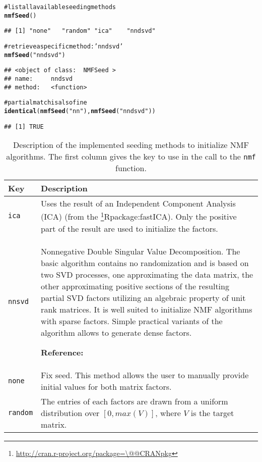 \documentclass[a4paper]{article}\usepackage{graphicx, color}
\makeatletter
\newcommand{\hlfunctioncall}[1]{\textcolor[rgb]{0.501960784313725,0,0.329411764705882}{\textbf{#1}}}%
\newcommand{\hlstring}[1]{\textcolor[rgb]{0.6,0.6,1}{#1}}%
\newcommand{\hlcomment}[1]{\textcolor[rgb]{0.180392156862745,0.6,0.341176470588235}{#1}}%
\newenvironment{kframe}{%
 \def\at@end@of@kframe{}%
 \ifinner\ifhmode%
  \def\at@end@of@kframe{\end{minipage}}%
  \begin{minipage}{\columnwidth}%
 \fi\fi%
 \def\FrameCommand##1{\hskip\@totalleftmargin \hskip-\fboxsep
 \colorbox{shadecolor}{##1}\hskip-\fboxsep
     \hskip-\linewidth \hskip-\@totalleftmargin \hskip\columnwidth}%
 \MakeFramed {\advance\hsize-\width
   \@totalleftmargin\z@ \linewidth\hsize
   \@setminipage}}%
 {\par\unskip\endMakeFramed%
 \at@end@of@kframe}
\newenvironment{knitrout}{}{} %
\let\code=\texttt
\newcommand{\pkgname}[1]{\textit{#1}\xspace}
\newcommand{\CRANurl}[1]{\url{http://cran.r-project.org/package=#1}}
\def\CRANpkg{\@ifstar\@CRANpkg\@@CRANpkg}
\def\@CRANpkg#1{\href{http://cran.r-project.org/package=#1}{\pkgname{#1}}\footnote{\CRANurl{#1}}}
\def\@@CRANpkg#1{\href{http://cran.r-project.org/package=#1}{\pkgname{#1}} package\footnote{\CRANurl{#1}}}
\def\citeCRANpkg{\@ifstar\@citeCRANpkg\@@citeCRANpkg}
\def\@citeCRANpkg#1{\CRANpkg{#1}\cite*{Rpackage:#1}}
\def\@@citeCRANpkg#1{\CRANpkg{#1}~\cite{Rpackage:#1}}
\renewcommand{\cite}[1]{\parencite{#1}}
\makeatother
\begin{document}
\begin{knitrout}
\color{fgcolor}\begin{kframe}
\begin{alltt}
\hlcomment{# list all available seeding methods}
\hlfunctioncall{nmfSeed}()
\end{alltt}
\begin{verbatim}
## [1] "none"   "random" "ica"    "nndsvd"
\end{verbatim}
\begin{alltt}
\hlcomment{# retrieve a specific method: 'nndsvd'}
\hlfunctioncall{nmfSeed}(\hlstring{"nndsvd"})
\end{alltt}
\begin{verbatim}
## <object of class:  NMFSeed >
## name:	 nndsvd 
## method:	 <function>
\end{verbatim}
\begin{alltt}
\hlcomment{# partial match is also fine}
\hlfunctioncall{identical}(\hlfunctioncall{nmfSeed}(\hlstring{"nn"}), \hlfunctioncall{nmfSeed}(\hlstring{"nndsvd"}))
\end{alltt}
\begin{verbatim}
## [1] TRUE
\end{verbatim}
\end{kframe}
\end{knitrout}


\begin{table}[h!t]
\begin{tabularx}{\textwidth}{lX}
\hline
Key & Description\\
\hline
\code{ica} & Uses the result of an Independent Component Analysis (ICA) (from
the \citeCRANpkg{fastICA}).
Only the positive part of the result are used to initialize the factors.\\
\hline
%
\code{nnsvd} & Nonnegative Double Singular Value Decomposition.
The basic algorithm contains no randomization and is based on two SVD processes, one approximating the data matrix, the other approximating positive sections of the resulting partial SVD factors utilizing an algebraic property of unit rank matrices. 
It is well suited to initialize NMF algorithms with sparse factors. Simple practical variants of the algorithm allows to generate dense factors.

\textbf{Reference:} \cite{Boutsidis2008}\\
\hline
%
\code{none} & Fix seed.
This method allows the user to manually provide initial values for both matrix factors.\\ 
\hline
%
\code{random} & The entries of each factors are drawn from a uniform distribution over $[0, max(V)]$, where $V$ is the target matrix.\\
\hline
\end{tabularx}
\caption{Description of the implemented seeding methods to initialize NMF algorithms.
The first column gives the key to use in the call to the \texttt{nmf} function.\label{tab:seed}}
\end{table}
\end{document}
